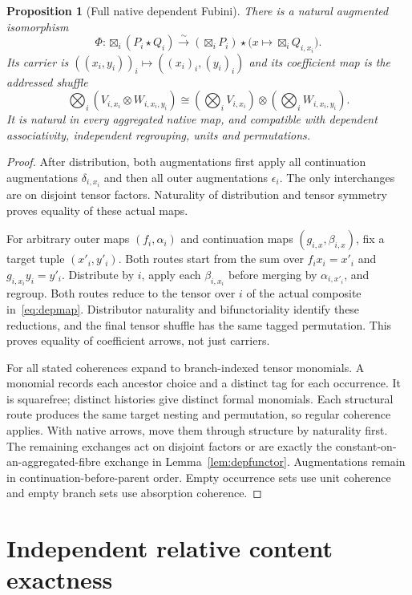 \documentclass[11pt,a4paper]{article}
\newtheorem{proposition}[theorem]{Proposition}
\theoremstyle{definition}
\newcommand{\starc}{\mathbin{\star}}
\begin{document}
\begin{proposition}[Full native dependent Fubini]\label{prop:fubini}
There is a natural augmented isomorphism
\[
 \Phi:\boxtimes_i(P_i\starc Q_i)
 \xrightarrow{\sim}
 (\boxtimes_iP_i)\starc\bigl(x\mapsto\boxtimes_iQ_{i,x_i}\bigr).
\]
Its carrier is $((x_i,y_i))_i\mapsto((x_i)_i,(y_i)_i)$ and its coefficient
map is the addressed shuffle
\[
 \bigotimes_i(V_{i,x_i}\otimes W_{i,x_i,y_i})
 \cong(\bigotimes_iV_{i,x_i})\otimes(\bigotimes_iW_{i,x_i,y_i}).
\]
It is natural in every aggregated native map, and compatible with dependent
associativity, independent regrouping, units and permutations.
\end{proposition}
\begin{proof}
After distribution, both augmentations first apply all continuation
augmentations $\delta_{i,x_i}$ and then all outer augmentations $\epsilon_i$.
The only interchanges are on disjoint tensor factors. Naturality of
distribution and tensor symmetry proves equality of these actual maps.

For arbitrary outer maps $(f_i,\alpha_i)$ and continuation maps
$(g_{i,x},\beta_{i,x})$, fix a target tuple $(x'_i,y'_i)$. Both routes start
from the sum over $f_ix_i=x'_i$ and $g_{i,x_i}y_i=y'_i$. Distribute by $i$,
apply each $\beta_{i,x_i}$ before merging by $\alpha_{i,x'_i}$, and regroup.
Both routes reduce to the tensor over $i$ of the actual composite
in~\eqref{eq:depmap}. Distributor naturality and bifunctoriality identify
these reductions, and the final tensor shuffle has the same tagged
permutation. This proves equality of coefficient arrows, not just carriers.

For all stated coherences expand to branch-indexed tensor monomials. A monomial
records each ancestor choice and a distinct tag for each occurrence. It is
squarefree; distinct histories give distinct formal monomials. Each structural
route produces the same target nesting and permutation, so regular coherence
applies. With native arrows, move them through structure by naturality first.
The remaining exchanges act on disjoint factors or are exactly the
constant-on-an-aggregated-fibre exchange in Lemma~\ref{lem:depfunctor}.
Augmentations remain in continuation-before-parent order. Empty occurrence
sets use unit coherence and empty branch sets use absorption coherence.
\end{proof}

\section{Independent relative content exactness}\label{sec:content}
\end{document}
